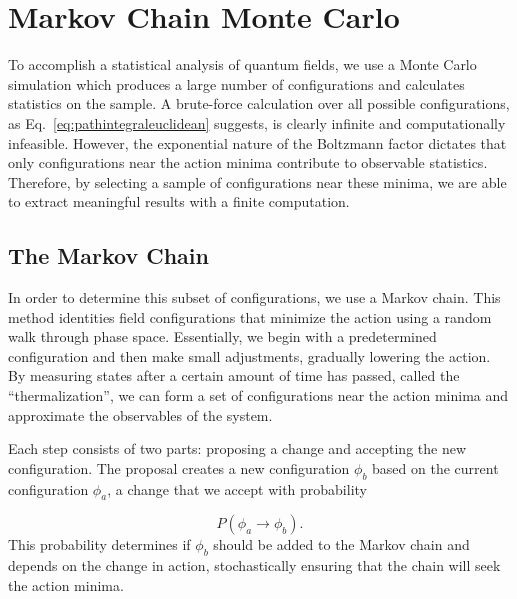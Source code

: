 \section{Markov Chain Monte Carlo}

To accomplish a statistical analysis of quantum fields, we use a Monte Carlo simulation which produces a large number of configurations and calculates statistics on the sample. A brute-force calculation over all possible configurations, as Eq.~\ref{eq:pathintegraleuclidean} suggests, is clearly infinite and computationally infeasible. However, the exponential nature of the Boltzmann factor dictates that only configurations near the action minima contribute to observable statistics. Therefore, by selecting a sample of configurations near these minima, we are able to extract meaningful results with a finite computation.

\subsection{The Markov Chain}
In order to determine this subset of configurations, we use a Markov chain. This method identities field configurations that minimize the action using a random walk through phase space. Essentially, we begin with a predetermined configuration and then make small adjustments, gradually lowering the action. By measuring states after a certain amount of time has passed, called the ``thermalization'', we can form a set of configurations near the action minima and approximate the observables of the system.

Each step consists of two parts: proposing a change and accepting the new configuration. The proposal creates a new configuration $\phi_b$ based on the current configuration $\phi_a$, a change that we accept with probability

\begin{equation}
P(\phi_a \rightarrow \phi_b).
\end{equation}
This probability determines if $\phi_b$ should be added to the Markov chain and depends on the change in action, stochastically ensuring that the chain will seek the action minima.

